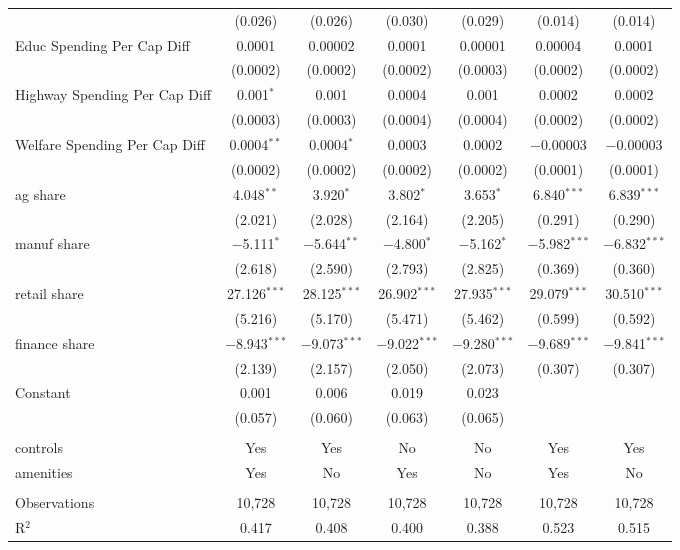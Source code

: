 \documentclass{article}
\begin{document}
\begin{table}[!htbp]
\begin{tabular}{@{\extracolsep{5pt}}lcccccc}
  & (0.026) & (0.026) & (0.030) & (0.029) & (0.014) & (0.014) \\ 
  Educ Spending Per Cap Diff & 0.0001 & 0.00002 & 0.0001 & 0.00001 & 0.00004 & 0.0001 \\ 
  & (0.0002) & (0.0002) & (0.0002) & (0.0003) & (0.0002) & (0.0002) \\ 
  Highway Spending Per Cap Diff & 0.001$^{*}$ & 0.001 & 0.0004 & 0.001 & 0.0002 & 0.0002 \\ 
  & (0.0003) & (0.0003) & (0.0004) & (0.0004) & (0.0002) & (0.0002) \\ 
  Welfare Spending Per Cap Diff & 0.0004$^{**}$ & 0.0004$^{*}$ & 0.0003 & 0.0002 & $-$0.00003 & $-$0.00003 \\ 
  & (0.0002) & (0.0002) & (0.0002) & (0.0002) & (0.0001) & (0.0001) \\ 
  ag share & 4.048$^{**}$ & 3.920$^{*}$ & 3.802$^{*}$ & 3.653$^{*}$ & 6.840$^{***}$ & 6.839$^{***}$ \\ 
  & (2.021) & (2.028) & (2.164) & (2.205) & (0.291) & (0.290) \\ 
  manuf share & $-$5.111$^{*}$ & $-$5.644$^{**}$ & $-$4.800$^{*}$ & $-$5.162$^{*}$ & $-$5.982$^{***}$ & $-$6.832$^{***}$ \\ 
  & (2.618) & (2.590) & (2.793) & (2.825) & (0.369) & (0.360) \\ 
  retail share & 27.126$^{***}$ & 28.125$^{***}$ & 26.902$^{***}$ & 27.935$^{***}$ & 29.079$^{***}$ & 30.510$^{***}$ \\ 
  & (5.216) & (5.170) & (5.471) & (5.462) & (0.599) & (0.592) \\ 
  finance share & $-$8.943$^{***}$ & $-$9.073$^{***}$ & $-$9.022$^{***}$ & $-$9.280$^{***}$ & $-$9.689$^{***}$ & $-$9.841$^{***}$ \\ 
  & (2.139) & (2.157) & (2.050) & (2.073) & (0.307) & (0.307) \\ 
  Constant & 0.001 & 0.006 & 0.019 & 0.023 &  &  \\ 
  & (0.057) & (0.060) & (0.063) & (0.065) &  &  \\ 
 \hline \\[-1.8ex] 
controls & Yes & Yes & No & No & Yes & Yes \\ 
amenities & Yes & No & Yes & No & Yes & No \\ 
\hline \\[-1.8ex] 
Observations & 10,728 & 10,728 & 10,728 & 10,728 & 10,728 & 10,728 \\ 
R$^{2}$ & 0.417 & 0.408 & 0.400 & 0.388 & 0.523 & 0.515 \\ 

\end{tabular}
\end{table}
\end{document}
